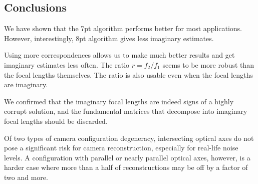 \subsection{Conclusions}

We have shown that the 7pt algorithm performs better for most applications. However, interestingly, 8pt algorithm gives less imaginary estimates.

Using more correspondences allows us to make much better results and get imaginary estimates less often. The ratio $r = {f_2}\slash{f_1}$ seems to be more robust than the focal lengths themselves. The ratio is also usable even when the focal lengths are imaginary. 


We confirmed that the imaginary focal lengths are indeed signs of a highly corrupt solution, and the fundamental matrices that decompose into imaginary focal lengths should be discarded.  

Of two types of camera configuration degeneracy, intersecting optical axes do not pose a significant risk for camera reconstruction, especially for real-life noise levels. A configuration with parallel or nearly parallel optical axes, however, is a harder case where more than a half of reconstructions may be off by a factor of two and more.
